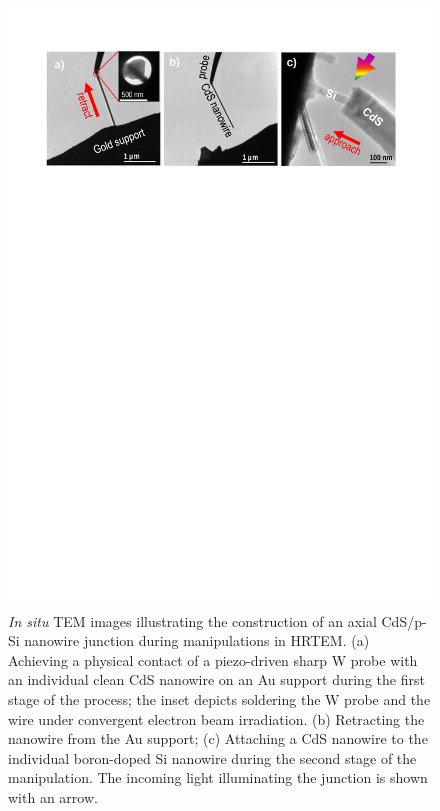 \begin{figure}
\includegraphics[width=\textwidth]{figures/figure3_1}
\caption[Making an axial junction.]{\textit{In situ} TEM images illustrating the construction of an axial CdS/p-Si nanowire junction during manipulations in HRTEM. (a) Achieving a physical contact of a piezo-driven sharp W probe with an individual clean CdS nanowire on an Au support during the first stage of the process; the inset depicts soldering the W probe and the wire under convergent electron beam irradiation. (b) Retracting the nanowire from the Au support; (c) Attaching a CdS nanowire to the individual boron-doped Si nanowire during the second stage of the manipulation. The incoming light illuminating the junction is shown with an arrow.
\label{fig:fig3_1}}
\end{figure}

